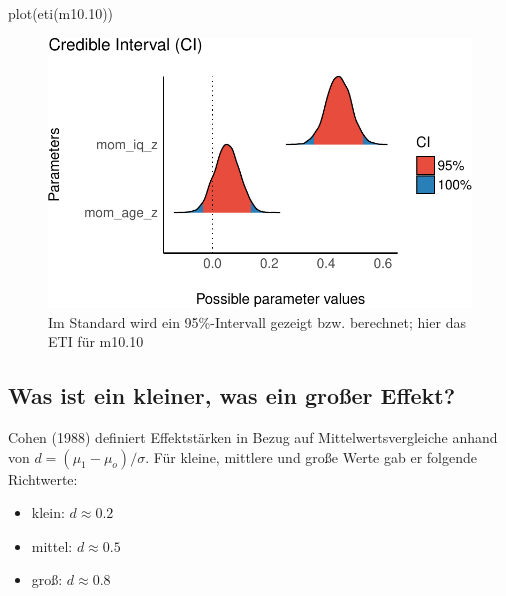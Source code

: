 \documentclass[
  a4paper,
  DIV=11]{scrreprt}
\newenvironment{Shaded}{\begin{snugshade}}{\end{snugshade}}
\newcommand{\FloatTok}[1]{\textcolor[rgb]{0.68,0.00,0.00}{#1}}
\newcommand{\FunctionTok}[1]{\textcolor[rgb]{0.28,0.35,0.67}{#1}}
\newcommand{\NormalTok}[1]{\textcolor[rgb]{0.00,0.23,0.31}{#1}}
\providecommand{\tightlist}{%
  \setlength{\itemsep}{0pt}\setlength{\parskip}{0pt}}\usepackage{longtable,booktabs,array}
\theoremstyle{definition}
\theoremstyle{remark}
\begin{document}
\begin{Shaded}
\begin{Highlighting}[]
\FunctionTok{plot}\NormalTok{(}\FunctionTok{eti}\NormalTok{(m10}\FloatTok{.10}\NormalTok{))}
\end{Highlighting}
\end{Shaded}

\begin{figure}[H]

{\centering \includegraphics{./metrische-AV_files/figure-pdf/fig-m1010hdi-1.pdf}

}

\caption{\label{fig-m1010hdi}Im Standard wird ein 95\%-Intervall gezeigt
bzw. berechnet; hier das ETI für m10.10}

\end{figure}

\hypertarget{was-ist-ein-kleiner-was-ein-grouxdfer-effekt}{%
\subsection{Was ist ein kleiner, was ein großer
Effekt?}\label{was-ist-ein-kleiner-was-ein-grouxdfer-effekt}}

Cohen (1988) definiert Effektstärken in Bezug auf Mittelwertsvergleiche
anhand von \(d=(\mu_1 - \mu_o) / \sigma\). Für kleine, mittlere und
große Werte gab er folgende Richtwerte:

\begin{itemize}
\tightlist
\item
  klein: \(d \approx 0.2\)
\item
  mittel: \(d \approx 0.5\)
\item
  groß: \(d \approx 0.8\)
\end{itemize}
\end{document}

